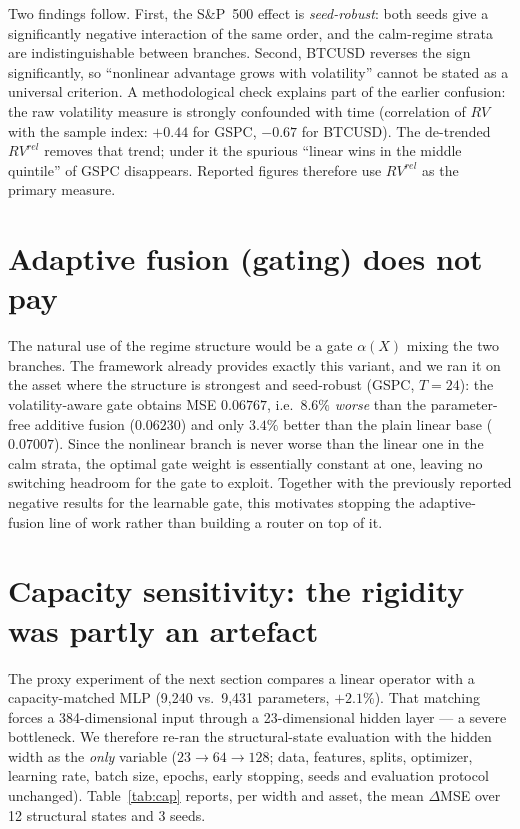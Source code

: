 \documentclass[preprint,12pt]{elsarticle}
\begin{document}
Two findings follow. First, the S\&P~500 effect is \emph{seed-robust}: both seeds give a
significantly negative interaction of the same order, and the calm-regime strata are
indistinguishable between branches. Second, BTCUSD reverses the sign significantly, so
``nonlinear advantage grows with volatility'' cannot be stated as a universal criterion.
A methodological check explains part of the earlier confusion: the raw volatility measure is
strongly confounded with time (correlation of $RV$ with the sample index: $+0.44$ for GSPC,
$-0.67$ for BTCUSD). The de-trended $RV^{rel}$ removes that trend; under it the spurious
``linear wins in the middle quintile'' of GSPC disappears. Reported figures therefore use
$RV^{rel}$ as the primary measure.

\section{Adaptive fusion (gating) does not pay}
\label{sec:gate}

The natural use of the regime structure would be a gate $\alpha(X)$ mixing the two branches.
The framework already provides exactly this variant, and we ran it on the asset where the
structure is strongest and seed-robust (GSPC, $T=24$): the volatility-aware gate obtains MSE
$0.06767$, i.e.\ $8.6\%$ \emph{worse} than the parameter-free additive fusion ($0.06230$) and
only $3.4\%$ better than the plain linear base ($0.07007$). Since the nonlinear branch is never
worse than the linear one in the calm strata, the optimal gate weight is essentially constant
at one, leaving no switching headroom for the gate to exploit. Together with the previously
reported negative results for the learnable gate, this motivates stopping the adaptive-fusion
line of work rather than building a router on top of it.

\section{Capacity sensitivity: the rigidity was partly an artefact}
\label{sec:capacity}

The proxy experiment of the next section compares a linear operator with a capacity-matched MLP
(9{,}240 vs.\ 9{,}431 parameters, $+2.1\%$). That matching forces a 384-dimensional input
through a 23-dimensional hidden layer --- a severe bottleneck. We therefore re-ran the
structural-state evaluation with the hidden width as the \emph{only} variable
($23 \to 64 \to 128$; data, features, splits, optimizer, learning rate, batch size, epochs,
early stopping, seeds and evaluation protocol unchanged). Table~\ref{tab:cap} reports, per
width and asset, the mean $\Delta$MSE over 12 structural states and 3 seeds.
\end{document}
